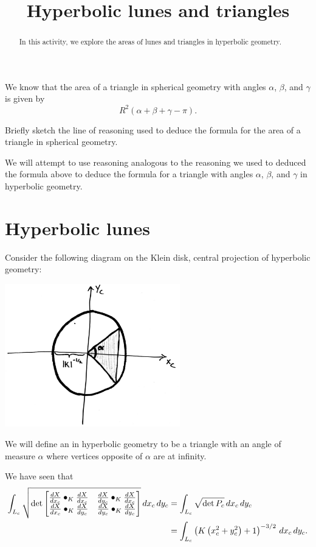 \documentclass[handout,newpage,nooutcomes,hints]{ximera}
\title{Hyperbolic lunes and triangles}
\begin{document}
\begin{abstract}
In this activity, we explore the areas of lunes and triangles in
hyperbolic geometry.
\end{abstract}
\maketitle

We know that the area of a triangle in spherical geometry with angles
$\alpha$, $\beta$, and $\gamma$ is given by
\[
R^2(\alpha+\beta+\gamma - \pi).
\]
\begin{problem}
  Briefly sketch the line of reasoning used to deduce the formula for
  the area of a triangle in spherical geometry.
\end{problem}

We will attempt to use reasoning analogous to the reasoning we used to
deduced the formula above to deduce the formula for a triangle with
angles $\alpha$, $\beta$, and $\gamma$ in hyperbolic geometry.

\section{Hyperbolic lunes}

Consider the following diagram on the Klein disk, central projection
of hyperbolic geometry:
\begin{image}
  \includegraphics[width=3in]{diagramOfHyperbolicLune.png}
\end{image}

\begin{definition}
  We will define an  in hyperbolic
  geometry to be a triangle with an angle of measure $\alpha$ where
  vertices opposite of $\alpha$ are at infinity.
\end{definition}

We have seen that
\begin{align*}
  \int_{L_c} \sqrt{
  \det
  \begin{bmatrix}
    \dd[X]{x_c}\bullet_K \dd[X]{x_c} & \dd[X]{y_c}\bullet_K \dd[X]{x_c} \\
    \dd[X]{x_c}\bullet_K \dd[X]{y_c} & \dd[X]{y_c}\bullet_K \dd[X]{y_c}
  \end{bmatrix}
  }\d x_c\d y_c &=
  \int_{L_c} \sqrt{\det P_c}\d x_c\d y_c\\
  &=\int_{L_c} \left(K\left(x_c^2+y_c^2\right)+1\right)^{-3/2} \d x_c\d y_c.
\end{align*}
\end{document}
